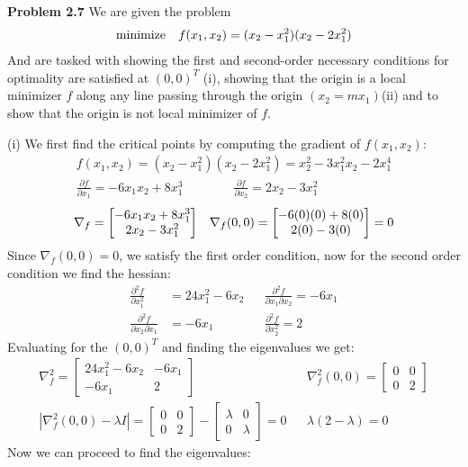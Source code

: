 \documentclass{article}
\begin{document}
 
\pagestyle{fancy}
\textbf{Problem 2.7} We are given the problem
\begin{align*}
    \text{minimize} \null \quad f(x_1,x_2) = (x_2 - x_1^2)(x_2-2x_1^2)
\end{align*}
And are tasked with showing the first and second-order necessary conditions for optimality are satisfied at $(0,0)^T$ (i), 
showing that the origin is a local minimizer $f$ along any line passing through the origin $(x_2 = mx_1)$(ii) and to show that the origin is not local minimizer of $f$.

(i) We first find the critical points by computing the gradient of $f(x_1, x_2)$:
\begin{align*}
    f(x_1,x_2) = (x_2 - x_1^2)(x_2-2x_1^2) = x_2^2 - 3x_1^2x_2 - 2x_1^4 \\
    \frac{\partial f}{\partial x_1}  = -6x_1x_2 + 8x_1^3 \qquad \qquad  \frac{\partial f}{\partial x_2} = 2x_2 - 3x_1^2
\end{align*}
\begin{align*}
    \null \nabla_f = \begin{bmatrix} -6x_1x_2 + 8x_1^3 \\ 2x_2 - 3x_1^2 \end{bmatrix} && 
        \null \nabla_f (0,0) = \begin{bmatrix} -6(0)(0) + 8(0) \\ 2(0) - 3(0) \end{bmatrix} = 0
\end{align*}
Since $\nabla_f(0,0) = 0$, we satisfy the first order condition, now for the second order condition we find the hessian:
\begin{align*}
    \frac{\partial^2f}{\partial x_1^2} &= 24x_1^2 - 6x_2 && \frac{\partial^2f}{\partial x_1 \partial x_2} = -6x_1 \\ 
    \frac{\partial^2f}{\partial x_2 \partial x_1} &= -6x_1 && \frac{\partial^2f}{\partial x_2^2} = 2 
\end{align*}
Evaluating for the $(0,0)^T$ and finding the eigenvalues we get:
\begin{align*}\nabla_f^2 = 
    \begin{bmatrix}
     24x_1^2 - 6x_2 & -6x_1 \\ 
    -6x_1 & 2 
    \end{bmatrix} && 
    \nabla_f^2(0,0) = 
    \begin{bmatrix}
    0 & 0 \\ 
    0  & 2 
    \end{bmatrix} \\
    |\nabla_f^2(0,0) - \lambda I | = 
    \begin{bmatrix}
    0 & 0 \\ 
    0  & 2 
    \end{bmatrix} - 
    \begin{bmatrix}
        \lambda & 0 \\
        0 & \lambda
    \end{bmatrix} = 0 &&
    \lambda(2-\lambda) = 0
\end{align*}
Now we can proceed to find the eigenvalues:
\end{document}
